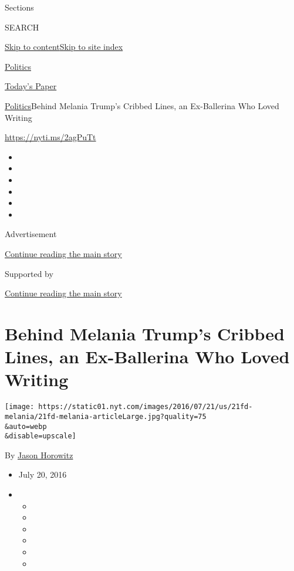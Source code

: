 Sections

SEARCH

\protect\hyperlink{site-content}{Skip to
content}\protect\hyperlink{site-index}{Skip to site index}

\href{https://www.nytimes.com/section/politics}{Politics}

\href{https://myaccount.nytimes.com/auth/login?response_type=cookie\&client_id=vi}{}

\href{https://www.nytimes.com/section/todayspaper}{Today's Paper}

\href{/section/politics}{Politics}\textbar{}Behind Melania Trump's
Cribbed Lines, an Ex-Ballerina Who Loved Writing

\url{https://nyti.ms/2agPuTt}

\begin{itemize}
\item
\item
\item
\item
\item
\item
\end{itemize}

Advertisement

\protect\hyperlink{after-top}{Continue reading the main story}

Supported by

\protect\hyperlink{after-sponsor}{Continue reading the main story}

\hypertarget{behind-melania-trumps-cribbed-lines-an-ex-ballerina-who-loved-writing}{%
\section{Behind Melania Trump's Cribbed Lines, an Ex-Ballerina Who Loved
Writing}\label{behind-melania-trumps-cribbed-lines-an-ex-ballerina-who-loved-writing}}

\texttt{[image: https://static01.nyt.com/images/2016/07/21/us/21fd-melania/21fd-melania-articleLarge.jpg?quality=75\\\&auto=webp\\\&disable=upscale]}

By \href{https://www.nytimes.com/by/jason-horowitz}{Jason Horowitz}

\begin{itemize}
\item
  July 20, 2016
\item
  \begin{itemize}
  \item
  \item
  \item
  \item
  \item
  \item
  \end{itemize}
\end{itemize}

